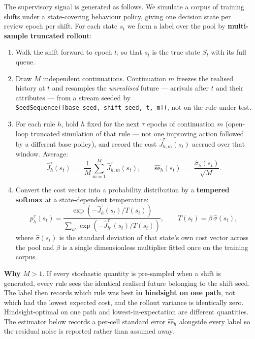 \documentclass[review,3p,times]{elsarticle}
\providecommand{\tightlist}{%
  \setlength{\itemsep}{0pt}\setlength{\parskip}{0pt}}
\theoremstyle{definition}
\begin{document}
The supervisory signal is generated as follows. We simulate a corpus of
training shifts under a state-covering behaviour policy, giving one
decision state per review epoch per shift. For each state \(s_t\) we
form a label over the pool by \textbf{multi-sample truncated rollout}:

\begin{enumerate}
\def\labelenumi{\arabic{enumi}.}
\tightlist
\item
  Walk the shift forward to epoch \(t\), so that \(s_t\) is the true
  state \(S_t\) with its full queue.
\item
  Draw \(M\) independent continuations. Continuation \(m\) freezes the
  realised history at \(t\) and resamples the \emph{unrealised} future
  --- arrivals after \(t\) and their attributes --- from a stream seeded
  by \texttt{SeedSequence({[}base\_seed,\ shift\_seed,\ t,\ m{]})}, not
  on the rule under test.
\item
  For each rule \(h\), hold \(h\) fixed for the next \(\tau\) epochs of
  continuation \(m\) (open-loop truncated simulation of that rule ---
  not one improving action followed by a different base policy), and
  record the cost \(\hat{J}^{\tau}_{h,m}(s_t)\) accrued over that
  window. Average:
  \[ \hat{J}^{\tau}_h(s_t) \;=\; \frac{1}{M}\sum_{m=1}^{M} \hat{J}^{\tau}_{h,m}(s_t), \qquad \widehat{\mathrm{se}}_h(s_t) \;=\; \frac{\hat{\sigma}_h(s_t)}{\sqrt{M}} . \]
\item
  Convert the cost vector into a probability distribution by a
  \textbf{tempered softmax} at a state-dependent temperature:
  \[ p^{\tau}_h(s_t) = \frac{\exp(-\hat{J}^{\tau}_h(s_t)/T(s_t))}{\sum_{h'} \exp(-\hat{J}^{\tau}_{h'}(s_t)/T(s_t))}, \qquad T(s_t) = \beta\,\hat\sigma(s_t), \]
  where \(\hat\sigma(s_t)\) is the standard deviation of that state's
  own cost vector across the pool and \(\beta\) is a single
  dimensionless multiplier fitted once on the training corpus.
\end{enumerate}

\textbf{Why \(M > 1\)}. If every stochastic quantity is pre-sampled when
a shift is generated, every rule sees the identical realised future
belonging to the shift seed. The label then records which rule was best
\textbf{in hindsight on one path}, not which had the lowest expected
cost, and the rollout variance is identically zero. Hindsight-optimal on
one path and lowest-in-expectation are different quantities. The
estimator below records a per-cell standard error
\(\widehat{\mathrm{se}}_h\) alongside every label so the residual noise
is reported rather than assumed away.
\end{document}
